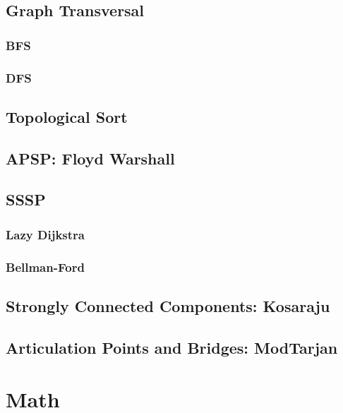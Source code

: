 \subsection{Graph Transversal}
\subsubsection{BFS}
\subsubsection{DFS}
\subsection{Topological Sort}
\subsection{APSP: Floyd Warshall}
\subsection{SSSP}
\subsubsection{Lazy Dijkstra}
\subsubsection{Bellman-Ford}
\subsection{Strongly Connected Components: Kosaraju}
\subsection{Articulation Points and Bridges: ModTarjan}

\section{Math}
